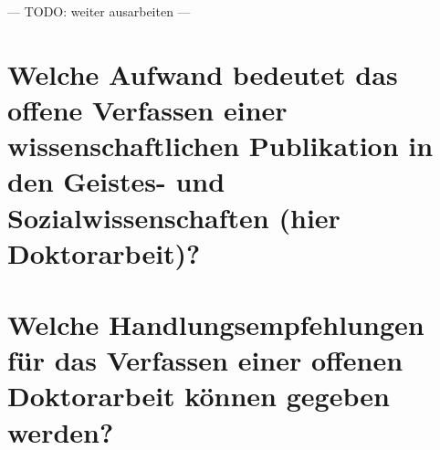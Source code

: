 --- TODO: weiter ausarbeiten ---

\section{Welche Aufwand bedeutet das offene Verfassen einer wissenschaftlichen Publikation in den Geistes- und Sozialwissenschaften (hier Doktorarbeit)?}


\section{Welche Handlungsempfehlungen für das Verfassen einer offenen Doktorarbeit können gegeben werden?}
